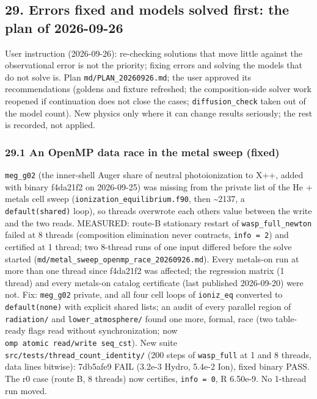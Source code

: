 \documentclass[english,a4paper]{my_memo}
\begin{document}
\subsection{29. Errors fixed and models solved first: the plan of 2026-09-26}\label{29-errors-fixed-and-models-solved-first-the-plan-of-2026-09-26}

User instruction (2026-09-26): re-checking solutions that move little
against the observational error is not the priority; fixing errors and
solving the models that do not solve is. Plan \texttt{md/PLAN\_20260926.md}; the
user approved its recommendations (goldens and fixture refreshed; the
composition-side solver work reopened if continuation does not close the
cases; \texttt{diffusion\_check} taken out of the model count). New physics only
where it can change results seriously; the rest is recorded, not applied.

\subsubsection{29.1 An OpenMP data race in the metal sweep (fixed)}\label{291-an-openmp-data-race-in-the-metal-sweep-fixed}

\texttt{meg\_g02} (the inner-shell Auger share of neutral photoionization to X++,
added with binary f4da21f2 on 2026-09-25) was missing from the private list
of the He + metals cell sweep (\texttt{ionization\_equilibrium.f90}, then \textasciitilde2137, a
\texttt{default(shared)} loop), so threads overwrote each other\textquotesingle s value between the
write and the two reads. MEASURED: route-B stationary restart of
\texttt{wasp\_full\_newton} failed at 8 threads (composition elimination never
contracts, \texttt{info\ =\ 2}) and certified at 1 thread; two 8-thread runs of one
input differed before the solve started (\texttt{md/metal\_sweep\_openmp\_race\_20260926.md}).
Every metals-on run at more than one thread since f4da21f2 was affected;
the regression matrix (1 thread) and every metals-on catalog certificate
(last published 2026-09-20) were not. Fix: \texttt{meg\_g02} private, and all four
cell loops of \texttt{ioniz\_eq} converted to \texttt{default(none)} with explicit shared
lists; an audit of every parallel region of \texttt{radiation/} and
\texttt{lower\_atmosphere/} found one more, formal, race (two table-ready flags read
without synchronization; now \texttt{omp\ atomic\ read/write\ seq\_cst}). New suite
\texttt{src/tests/thread\_count\_identity/} (200 steps of \texttt{wasp\_full} at 1 and 8
threads, data lines bitwise): 7db5afe9 FAIL (3.2e-3 Hydro, 5.4e-2 Ion),
fixed binary PASS. The r0 case (route B, 8 threads) now certifies,
\texttt{info\ =\ 0}, \textbar\textbar R\textbar\textbar{} 6.50e-9. No 1-thread run moved.
\end{document}
